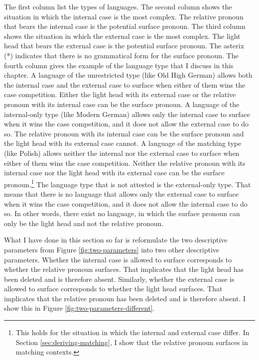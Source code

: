 The first column list the types of languages.
The second column shows the situation in which the internal case is the most complex. The relative pronoun that bears the internal case is the potential surface pronoun.
The third column shows the situation in which the external case is the most complex. The light head that bears the external case is the potential surface pronoun.
The asterix (*) indicates that there is no grammatical form for the surface pronoun.
The fourth column gives the example of the language type that I discuss in this chapter.
A language of the unrestricted type (like Old High German) allows both the internal case and the external case to surface when either of them wins the case competition. Either the light head with its external case or the relative pronoun with its internal case can be the surface pronoun.
A language of the internal-only type (like Modern German) allows only the internal case to surface when it wins the case competition, and it does not allow the external case to do so. The relative pronoun with its internal case can be the surface pronoun and the light head with its external case cannot.
A language of the matching type (like Polish) allows neither the internal nor the external case to surface when either of them wins the case competition. Neither the relative pronoun with its internal case nor the light head with its external case can be the surface pronoun.\footnote{
This holds for the situation in which the internal and external case differ. In Section \ref{sec:deriving-matching}, I show that the relative pronoun surfaces in matching contexts.
}
The language type that is not attested is the external-only type. That means that there is no language that allows only the external case to surface when it wins the case competition, and it does not allow the internal case to do so. In other words, there exist no language, in which the surface pronoun can only be the light head and not the relative pronoun.

What I have done in this section so far is reformulate the two descriptive parameters from Figure \ref{fig:two-parameters} into two other descriptive parameters.
Whether the internal case is allowed to surface corresponds to whether the relative pronoun surfaces. That implicates that the light head has been deleted and is therefore absent.
Similarly, whether the external case is allowed to surface corresponds to whether the light head surfaces. That implicates that the relative pronoun has been deleted and is therefore absent.
I show this in Figure \ref{fig:two-parameters-different}.

